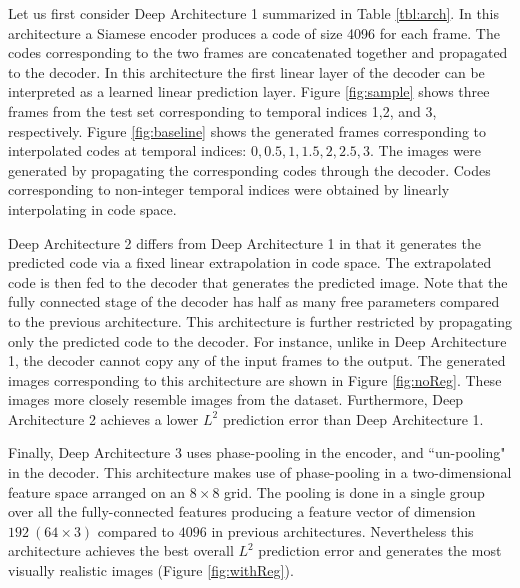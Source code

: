 Let us first consider Deep Architecture 1 summarized in Table \ref{tbl:arch}. In this architecture a Siamese encoder produces a code of size 4096 for each frame. The codes corresponding to the two frames are concatenated together and propagated to the decoder. In this architecture the first linear layer of the decoder can be interpreted as a learned linear prediction layer. Figure \ref{fig:sample} shows three frames from the test set corresponding to temporal indices 1,2, and 3, respectively. Figure \ref{fig:baseline} shows the generated frames corresponding to interpolated codes at temporal indices: ${0,0.5,1,1.5,2,2.5,3}$. The images were generated by propagating the corresponding codes through the decoder. Codes corresponding to non-integer temporal indices were obtained by linearly interpolating in code space. 

Deep Architecture 2 differs from Deep Architecture 1 in that it generates the predicted code via a fixed linear extrapolation in code space. The extrapolated code is then fed to the decoder that generates the predicted image. Note that the fully connected stage of the decoder has half as many free parameters compared to the previous architecture. This architecture is further restricted by propagating only the predicted code to the decoder. For instance, unlike in Deep Architecture 1, the decoder cannot copy any of the input frames to the output. The generated images corresponding to this architecture are shown in Figure \ref{fig:noReg}. These images more closely resemble images from the dataset. Furthermore, Deep Architecture 2 achieves a lower $L^2$ prediction error than Deep Architecture 1. 

Finally, Deep Architecture 3 uses phase-pooling in the encoder, and ``un-pooling" in the decoder. This architecture makes use of phase-pooling in a two-dimensional feature space arranged on an $8\times8$ grid. The pooling is done in a single group over all the fully-connected features producing a feature vector of dimension $192~(64 \times 3 )$ compared to $4096$ in previous architectures. Nevertheless this architecture achieves the best overall $L^2$ prediction error and generates the most visually realistic images (Figure \ref{fig:withReg}). 

